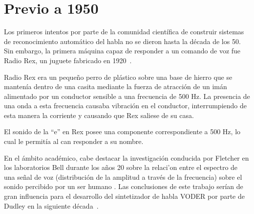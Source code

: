 \section{Previo a 1950}
\label{sec:pre50s}

Los primeros intentos por parte de la comunidad cient\'{i}fica de construir sistemas de 
reconocimiento autom\'{a}tico del habla no se dieron hasta la d\'{e}cada de los 50. 
Sin embargo, la primera m\'{a}quina capaz de responder a un comando de voz fue Radio Rex, 
un juguete fabricado en \mbox{1920 \cite{AnusuyaSpeech2009}}.

Radio Rex era un peque\~{n}o perro de pl\'{a}stico sobre una base de hierro que se manten\'{i}a dentro de una casita
mediante la fuerza de atracci\'{o}n de un im\'{a}n alimentado por un conductor sensible a una frecuencia de 500 Hz.
La presencia de una onda a esta frecuencia causaba vibraci\'{o}n en el conductor, interrumpiendo de
esta manera la corriente y causando que Rex saliese de su casa. 

El sonido de la ``e'' en Rex posee una componente correspondiente a 500 Hz, lo cual le permit\'{i}a al can responder a su nombre.

En el \'{a}mbito acad\'{e}mico, cabe destacar la investigaci\'{o}n conducida por Fletcher en los laboratorios Bell
durante los a\~{n}os 20 sobre la relaci'{o}n entre el espectro de una se\~{n}al de voz (distribuci\'{o}n de 
la amplitud a trav\'{e}s de la frecuencia) sobre el sonido percibido por un ser humano \cite{FletcherNature1922}. 
Las conclusiones de este trabajo ser\'{i}an de gran influencia para el desarrollo del sintetizador de habla VODER por parte de Dudley en la siguiente \mbox{d\'{e}cada \cite{JuangAutomaticSpeech}}. 

